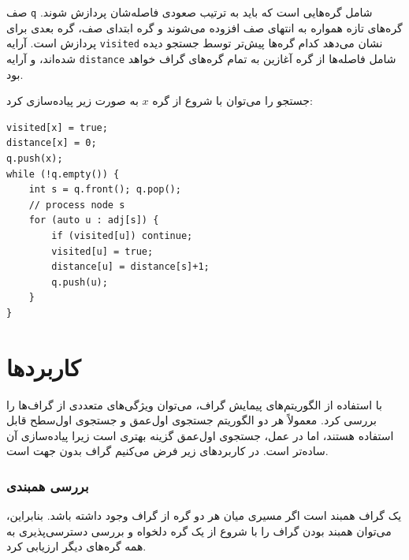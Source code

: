 صف \texttt{q} شامل گره‌هایی است که باید به ترتیب صعودی فاصله‌شان
پردازش شوند. گره‌های تازه همواره به انتهای صف افزوده می‌شوند
و گره ابتدای صف، گره بعدی برای پردازش است.
آرایه \texttt{visited} نشان می‌دهد کدام گره‌ها پیش‌تر توسط جستجو دیده شده‌اند،
و آرایه \texttt{distance} شامل فاصله‌ها از گره آغازین به تمام گره‌های گراف خواهد بود.

جستجو را می‌توان با شروع از گره $x$ به صورت زیر پیاده‌سازی کرد:
\begin{lstlisting}
visited[x] = true;
distance[x] = 0;
q.push(x);
while (!q.empty()) {
    int s = q.front(); q.pop();
    // process node s
    for (auto u : adj[s]) {
        if (visited[u]) continue;
        visited[u] = true;
        distance[u] = distance[s]+1;
        q.push(u);
    }
}
\end{lstlisting}

\section{کاربردها}

با استفاده از الگوریتم‌های پیمایش گراف،
می‌توان ویژگی‌های متعددی از گراف‌ها را بررسی کرد.
معمولاً هر دو الگوریتم جستجوی اول‌عمق و جستجوی اول‌سطح
قابل استفاده هستند، اما در عمل، جستجوی اول‌عمق
گزینه بهتری است زیرا پیاده‌سازی آن ساده‌تر است.
در کاربردهای زیر فرض می‌کنیم گراف بدون جهت است.

\subsubsection{بررسی همبندی}


یک گراف همبند است اگر مسیری میان هر دو گره از گراف وجود داشته باشد.
بنابراین، می‌توان همبند بودن گراف را با شروع از یک گره دلخواه
و بررسی دسترسی‌پذیری به همه گره‌های دیگر ارزیابی کرد.

